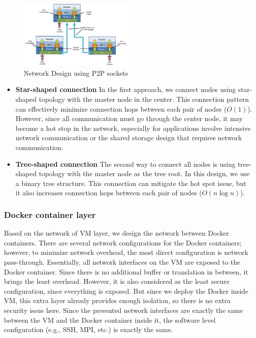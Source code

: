 \begin{figure}[h]
    \centering
    \includegraphics[width=0.5\textwidth]{figures/p2p.pdf}
    \caption{Network Design using P2P sockets}
    \label{p2p}
\end{figure}

\begin{itemize}
\item \textbf{Star-shaped connection}
In the first approach, we connect nodes using star-shaped topology with the master node in the center. This connection pattern can effectively minimize connection hops between each pair of nodes ($O(1)$). However, since all communication must go through the center node, it may become a hot stop in the network, especially for applications involve intensive network communication or the shared storage design that requires network communication.
\item \textbf{Tree-shaped connection}
The second way to connect all nodes is using tree-shaped topology with the master node as the tree root. In this design, we use a binary tree structure. This connection can mitigate the hot spot issue, but it also increases connection hops between each pair of nodes ($O(n\log{n})$). 
\end{itemize}

\subsubsection{Docker container layer}
Based on the network of VM layer, we design the network between Docker containers. There are several network configurations for the Docker containers; however, to minimize network overhead, the most direct configuration is network pass-through. Essentially, all network interfaces on the VM are exposed to the Docker container. Since there is no additional buffer or translation in between, it brings the least overhead. However, it is also considered as the least secure configuration, since everything is exposed. But since we deploy the Docker inside VM, this extra layer already provides enough isolation, so there is no extra security issue here. Since the presented network interfaces are exactly the same between the VM and the Docker container inside it, the software level configuration (e.g., SSH, MPI, etc.) is exactly the same.

